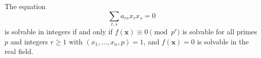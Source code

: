 \begin{proposition}\label{eq:014}
    The equation
\[
    \sum_{r,s}a_{rs}x_rx_s=0
\]
    is solvable in integers if and only if $f(\mathbf{x})\equiv0\pmod{p^r}$ is solvable for all primes $p$ and integers $r\ge1$ with $(x_1,\ldots,x_n,p)=1$, and $f(\mathbf{x})=0$ is solvable in the real field.
\end{proposition}
